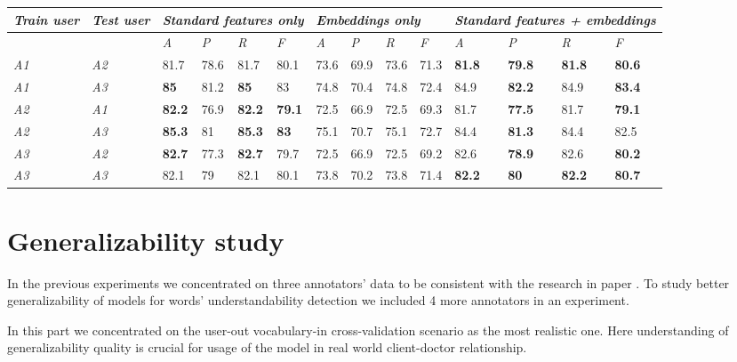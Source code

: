 \begin{tabular}{|p{0.3in}|p{0.2in}|p{0.2in}|p{0.2in}|p{0.2in}|p{0.2in}|p{0.2in}|p{0.2in}|p{0.2in}|p{0.2in}|p{0.2in}|p{0.2in}|p{0.2in}|p{0.2in}|} \hline 
\textit{Train user} & \textit{Test user} & \multicolumn{4}{|p{0.8in}|}{\textit{Standard features only}} & \multicolumn{4}{|p{0.8in}|}{\textit{Embeddings only}} & \multicolumn{4}{|p{0.8in}|}{\textit{Standard features + embeddings}} \\ \hline 
\textit{} & \textit{} & \textit{A} & \textit{P} & \textit{R} & \textit{F} & \textit{A} & \textit{P} & \textit{R} & \textit{F} & \textit{A} & \textit{P} & \textit{R} & \textit{F} \\ \hline 
\textit{A1} & \textit{A2} & 81.7 & 78.6 & 81.7 & 80.1 & 73.6 & 69.9 & 73.6 & 71.3 & \textbf{81.8} & \textbf{79.8} & \textbf{81.8} & \textbf{80.6} \\ \hline 
\textit{A1} & \textit{A3} & \textbf{85} & 81.2 & \textbf{85} & 83 & 74.8 & 70.4 & 74.8 & 72.4 & 84.9 & \textbf{82.2} & 84.9 & \textbf{83.4} \\ \hline 
\textit{A2} & \textit{A1} & \textbf{82.2} & 76.9 & \textbf{82.2} & \textbf{79.1} & 72.5 & 66.9 & 72.5 & 69.3 & 81.7 & \textbf{77.5} & 81.7 & \textbf{79.1} \\ \hline 
\textit{A2} & \textit{A3} & \textbf{85.3} & 81 & \textbf{85.3} & \textbf{83} & 75.1 & 70.7 & 75.1 & 72.7 & 84.4 & \textbf{81.3} & 84.4 & 82.5 \\ \hline 
\textit{A3} & \textit{A2} & \textbf{82.7} & 77.3 & \textbf{82.7} & 79.7 & 72.5 & 66.9 & 72.5 & 69.2 & 82.6 & \textbf{78.9} & 82.6 & \textbf{80.2} \\ \hline 
\textit{A3} & \textit{A3} & 82.1 & 79 & 82.1 & 80.1 & 73.8 & 70.2 & 73.8 & 71.4 & \textbf{82.2} & \textbf{80} & \textbf{82.2} & \textbf{80.7} \\ \hline 
\end{tabular}

\section{Generalizability study}

In the previous experiments we concentrated on three annotators' data to be consistent with the research in paper \citep{Grabar-PITR2014}. To study better generalizability of models for words' understandability detection we included 4 more annotators in an experiment.

In this part we concentrated on the user-out vocabulary-in cross-validation scenario as the most realistic one. Here understanding of generalizability quality is crucial for usage of the model in real world client-doctor relationship.

